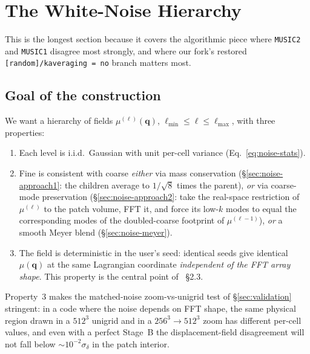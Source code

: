 \documentclass[12pt]{article}
\newcommand{\bq}{\mathbf{q}}
\newcommand{\code}[1]{\texttt{#1}}
\begin{document}
\section{The White-Noise Hierarchy}
\label{sec:noise}

This is the longest section because it covers the algorithmic piece
where \texttt{MUSIC2} and \texttt{MUSIC1} disagree most strongly,
and where our fork's restored \code{[random]/kaveraging = no} branch
matters most.

\subsection{Goal of the construction}
\label{sec:noise-goal}

We want a hierarchy of fields $\mu^{(\ell)}(\bq)$, $\ell_\mathrm{min}
\le \ell \le \ell_\mathrm{max}$, with three properties:
\begin{enumerate}
  \item Each level is i.i.d.\ Gaussian with unit per-cell variance
        (Eq.~\ref{eq:noise-stats}).
  \item Fine is consistent with coarse \emph{either} via
        mass conservation (\S\ref{sec:noise-approach1}: the
        children average to $1/\sqrt{8}$ times the parent),
        \emph{or} via coarse-mode preservation
        (\S\ref{sec:noise-approach2}: take the real-space
        restriction of $\mu^{(\ell)}$ to the patch volume, FFT it,
        and force its low-$k$ modes to equal the corresponding
        modes of the doubled-coarse footprint of $\mu^{(\ell-1)}$),
        \emph{or} a smooth Meyer blend
        (\S\ref{sec:noise-meyer}).
  \item The field is deterministic in the user's seed:
        identical seeds give identical $\mu(\bq)$ at the same
        Lagrangian coordinate \emph{independent of the FFT array
        shape}.  This property is the central point of
        \citet{Hahn2011}~\S2.3.
\end{enumerate}

Property~3 makes the matched-noise zoom-vs-unigrid test of
\S\ref{sec:validation} stringent: in a code where the noise depends
on FFT shape, the same physical region drawn in a $512^3$ unigrid
and in a $256^3 \to 512^3$ zoom has different per-cell values, and
even with a perfect Stage~B the displacement-field disagreement
will not fall below $\sim 10^{-2}\sigma_\delta$ in the patch interior.
\end{document}
